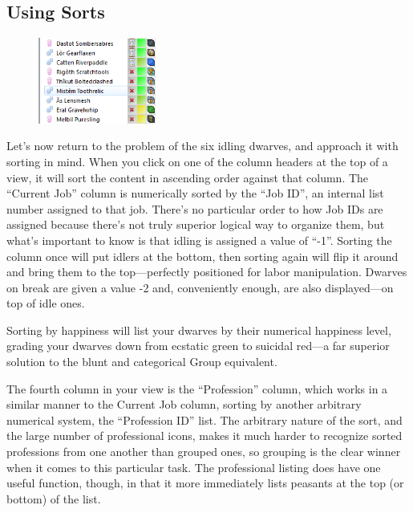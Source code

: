 \documentclass[]{article}
\begin{document}
\subsection{Using Sorts}
\label{sec:Using Sorts}
\begin{figure}
\vspace{-20pt}
  \begin{center}
    \includegraphics[width=0.35\textwidth]{Sec2Fig10}
  \end{center}
\vspace{-10pt}
\end{figure}
Let's now return to the problem of the six idling dwarves, and approach it with sorting in mind. When you
click on one of the column headers at the top of a view, it will sort the content in ascending order
against that column. The ``Current Job'' column is numerically sorted by the ``Job ID'', an internal list
number assigned to that job. There's no particular order to how Job IDs are assigned because there's not
truly superior logical way to organize them, but what's important to know is that idling is assigned a
value of ``-1''. Sorting the column once will put idlers at the bottom, then sorting again will flip it
around and bring them to the top---perfectly positioned for labor manipulation. Dwarves on break are
given a value -2 and, conveniently enough, are also displayed---on top of idle ones.

Sorting by happiness will list your dwarves by their numerical happiness level, grading your dwarves
down from ecstatic green to suicidal red---a far superior solution to the blunt and categorical Group
equivalent.

The fourth column in your view is the ``Profession'' column, which works in a similar manner to the
Current Job column, sorting by another arbitrary numerical system, the ``Profession ID'' list. The
arbitrary nature of the sort, and the large number of professional icons, makes it much harder to
recognize sorted professions from one another than grouped ones, so grouping is the clear winner when it
comes to this particular task. The professional listing does have one useful function, though, in that
it more immediately lists peasants at the top (or bottom) of the list.
\end{document}

